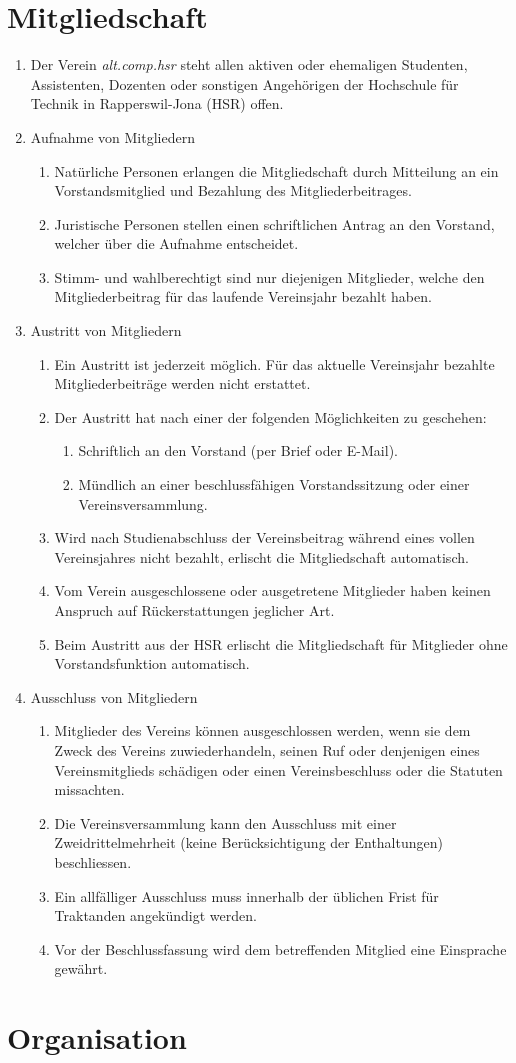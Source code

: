 \documentclass[10pt,a4paper,parskip,fleqn]{scrartcl}
\newcommand{\ol}{\begin{enumerate}[itemsep=-0.2em,topsep=-0.2em]}
\newcommand{\lo}{\end{enumerate}}
\newcommand{\li}{\item}
\begin{document}
\section{Mitgliedschaft}

\ol
  \li Der Verein \textit{alt.comp.hsr} steht allen aktiven oder ehemaligen
  Studenten, Assistenten, Dozenten oder sonstigen Angehörigen der Hochschule für
  Technik in Rapperswil-Jona (HSR) offen.
  \li Aufnahme von Mitgliedern
    \ol
      \li Natürliche Personen erlangen die Mitgliedschaft durch Mitteilung an
      ein Vorstandsmitglied und Bezahlung des Mitgliederbeitrages.
      \li Juristische Personen stellen einen schriftlichen Antrag an den
      Vorstand, welcher über die Aufnahme entscheidet.
      \li Stimm- und wahlberechtigt sind nur diejenigen Mitglieder, welche den
      Mitgliederbeitrag für das laufende Vereinsjahr bezahlt haben.
    \lo
  \li Austritt von Mitgliedern
    \ol
      \li Ein Austritt ist jederzeit möglich. Für das aktuelle Vereinsjahr
      bezahlte Mitgliederbeiträge werden nicht erstattet.
      \li Der Austritt hat nach einer der folgenden Möglichkeiten zu geschehen:
        \ol
          \li Schriftlich an den Vorstand (per Brief oder E-Mail).
          \li Mündlich an einer beschlussfähigen Vorstandssitzung oder einer
           Vereinsversammlung.
        \lo
      \li Wird nach Studienabschluss der Vereinsbeitrag während eines vollen
      Vereinsjahres nicht bezahlt, erlischt die Mitgliedschaft automatisch.
      \li Vom Verein ausgeschlossene oder ausgetretene Mitglieder haben keinen
      Anspruch auf Rückerstattungen jeglicher Art.
      \li Beim Austritt aus der HSR erlischt die Mitgliedschaft für Mitglieder
      ohne Vorstandsfunktion automatisch.
    \lo
  \li{Ausschluss von Mitgliedern}
    \ol
      \li Mitglieder des Vereins können ausgeschlossen werden, wenn sie dem
      Zweck des Vereins zuwiederhandeln, seinen Ruf oder denjenigen eines
      Vereinsmitglieds schädigen oder einen Vereinsbeschluss oder die Statuten
      missachten.
      \li Die Vereinsversammlung kann den Ausschluss mit einer
      Zweidrittelmehrheit (keine Berücksichtigung der Enthaltungen)
      beschliessen.
      \li Ein allfälliger Ausschluss muss innerhalb der üblichen Frist für
      Traktanden angekündigt werden.
      \li Vor der Beschlussfassung wird dem betreffenden Mitglied eine
      Einsprache gewährt.
    \lo
\lo


\section{Organisation}
\end{document}
